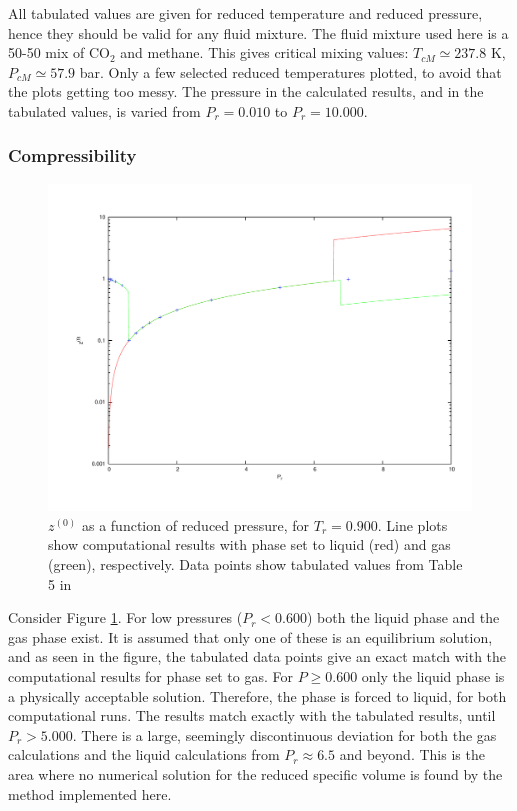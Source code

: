 \documentclass[english]{../thermomemo/thermomemo}
\numberwithin{equation}{section}
\begin{document}
All tabulated values are given for reduced temperature and reduced pressure, hence they should be valid for any fluid mixture. The fluid mixture used here is a 50-50 mix of CO$_2$ and methane. This gives critical mixing values: $T_{cM} \simeq 237.8$ K, $P_{cM} \simeq 57.9$ bar. Only a few selected reduced temperatures plotted, to avoid that the plots getting too messy. The pressure in the calculated results, and in the tabulated values, is varied from $P_r = 0.010$ to $P_r = 10.000$.

\subsubsection*{Compressibility}
\begin{figure}
	\centering
	\includegraphics[trim = 1.5cm 2cm 0 1cm, clip = true, width=14cm]{z0Tc090}
	\caption{$z^{(0)}$ as a function of reduced pressure, for $T_r = 0.900$. Line plots show computational results with phase set to liquid (red) and gas (green), respectively. Data points show tabulated values from Table 5 in \cite{LK}}
	\label{fig:z0Tc090}
\end{figure}

Consider Figure \ref{fig:z0Tc090}. For low pressures ($P_r < 0.600$) both the liquid phase and the gas phase exist. It is assumed that only one of these is an equilibrium solution, and as seen in the figure, the tabulated data points give an exact match with the computational results for phase set to gas. For $P \geq 0.600$ only the liquid phase is a physically acceptable solution. Therefore, the phase is forced to liquid, for both computational runs. The results match exactly with the tabulated results, until $P_r > 5.000$. There is a large, seemingly discontinuous deviation for both the gas calculations and the liquid calculations from $P_r \approx 6.5$ and beyond. This is the area where no numerical solution for the reduced specific volume is found by the method implemented here.
\end{document}

